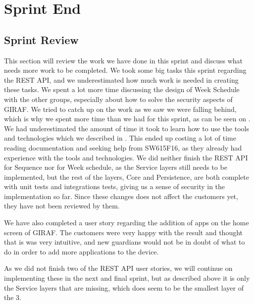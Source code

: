 \chapter{Sprint End}

\section{Sprint Review}\label{sec:sprintreview3}
This section will review the work we have done in this sprint and discuss what needs more work to be completed.
We took some big tasks this sprint regarding the REST API, and we underestimated how much work is needed in creating these tasks.
We spent a lot more time discussing the design of Week Schedule with the other groups, especially about how to solve the security aspects of GIRAF.
We tried to catch up on the work as we saw we were falling behind, which is why we spent more time than we had for this sprint, as can be seen on .
We had underestimated the amount of time it took to learn how to use the tools and technologies which we described in  .
This ended up costing a lot of time reading documentation and seeking help from SW615F16, as they already had experience with the tools and technologies.
We did neither finish the REST API for Sequence nor for Week schedule, as the Service layers still needs to be implemented, but the rest of the layers, Core and Persistence, are both complete with unit tests and integrations tests, giving us a sense of security in the implementation so far. 
Since these changes does not affect the customers yet, they have not been reviewed by them.

We have also completed a user story regarding the addition of apps on the home screen of GIRAF.
The customers were very happy with the result and thought that is was very intuitive, and new guardians would not be in doubt of what to do in order to add more applications to the device.

As we did not finish two of the REST API user stories, we will continue on implementing these in the next and final sprint, but as described above it is only the Service layers that are missing, which does seem to be the smallest layer of the 3.

